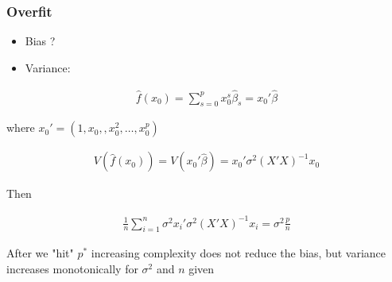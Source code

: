 \documentclass[
  shownotes,
  xcolor={svgnames},
  hyperref={colorlinks,citecolor=DarkBlue,linkcolor=DarkRed,urlcolor=DarkBlue}
  ]{beamer}
\begin{document}
\begin{frame}[fragile]
\frametitle{Overfit}


\begin{itemize}

  \item Bias ?
  \item Variance:
\end{itemize}

  \begin{align}
  \hat f(x_0) = \sum_{s=0}^p x_0^s\hat\beta_s = x_0'\hat\beta  
  \end{align}

  where $x_0'=(1,x_0,,x_0^2,\dots,x_0^p)$

  \begin{align}
  V(\hat f(x_0) ) = V(x_0'\hat\beta) = x_0'\sigma^2(X'X)^{-1}x_0
  \end{align}

  Then 

  \begin{align}
\frac{1}{n}\sum_{i=1}^n\sigma^2 x_{i}'\sigma^2(X'X)^{-1}x_{i}= \sigma^2 \frac{p}{n}
\end{align}


After we "hit" $p^*$ increasing complexity does not reduce the bias, but variance increases monotonically for $\sigma^2$ and $n$ given
 


\end{frame}
\end{document}
